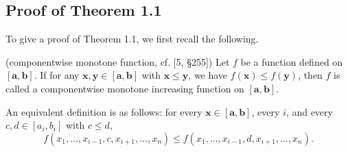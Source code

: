 \documentclass{ijclclp}
\begin{document}
\subsection{Proof of Theorem 1.1}
To give a proof of Theorem 1.1, we first recall the following. 

\begin{definition}{(componentwise monotone function, cf. [5, \S 255])}
    Let \(f\) be a function defined on \([\boldsymbol{a},\boldsymbol{b}]\). If for any \(\boldsymbol{x},\boldsymbol{y}\in[\boldsymbol{a},\boldsymbol{b}]\) with $\boldsymbol{x}\leq\boldsymbol{y}$, we have  \(f(\boldsymbol{x})\leq f(\boldsymbol{y})\), then \(f\) is called a componentwise monotone increasing function on \([\boldsymbol{a},\boldsymbol{b}]\). 
\end{definition}
\begin{remark}
    An equivalent definition is as follows: for every \(\boldsymbol{x}\in[\boldsymbol{a},\boldsymbol{b}]\), every \(i\), and every $c, d\in[a_i, b_i]$ with \(c\leq d\), 
    \[f(x_1,\dots,x_{i-1},c,x_{i+1},\dots,x_n)\leq f(x_1,\dots,x_{i-1},d,x_{i+1},\dots,x_n).\]
\end{remark}
\end{document}
